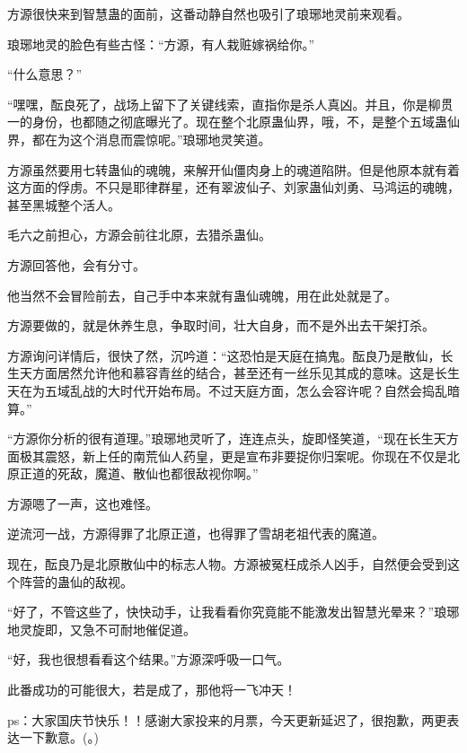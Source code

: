 \begin{this_body}
方源很快来到智慧蛊的面前，这番动静自然也吸引了琅琊地灵前来观看。

琅琊地灵的脸色有些古怪：“方源，有人栽赃嫁祸给你。”

“什么意思？”

“嘿嘿，酝良死了，战场上留下了关键线索，直指你是杀人真凶。并且，你是柳贯一的身份，也都随之彻底曝光了。现在整个北原蛊仙界，哦，不，是整个五域蛊仙界，都在为这个消息而震惊呢。”琅琊地灵笑道。

方源虽然要用七转蛊仙的魂魄，来解开仙僵肉身上的魂道陷阱。但是他原本就有着这方面的俘虏。不只是耶律群星，还有翠波仙子、刘家蛊仙刘勇、马鸿运的魂魄，甚至黑城整个活人。

毛六之前担心，方源会前往北原，去猎杀蛊仙。

方源回答他，会有分寸。

他当然不会冒险前去，自己手中本来就有蛊仙魂魄，用在此处就是了。

方源要做的，就是休养生息，争取时间，壮大自身，而不是外出去干架打杀。

方源询问详情后，很快了然，沉吟道：“这恐怕是天庭在搞鬼。酝良乃是散仙，长生天方面居然允许他和慕容青丝的结合，甚至还有一丝乐见其成的意味。这是长生天在为五域乱战的大时代开始布局。不过天庭方面，怎么会容许呢？自然会捣乱暗算。”

“方源你分析的很有道理。”琅琊地灵听了，连连点头，旋即怪笑道，“现在长生天方面极其震怒，新上任的南荒仙人药皇，更是宣布非要捉你归案呢。你现在不仅是北原正道的死敌，魔道、散仙也都很敌视你啊。”

方源嗯了一声，这也难怪。

逆流河一战，方源得罪了北原正道，也得罪了雪胡老祖代表的魔道。

现在，酝良乃是北原散仙中的标志人物。方源被冤枉成杀人凶手，自然便会受到这个阵营的蛊仙的敌视。

“好了，不管这些了，快快动手，让我看看你究竟能不能激发出智慧光晕来？”琅琊地灵旋即，又急不可耐地催促道。

“好，我也很想看看这个结果。”方源深呼吸一口气。

此番成功的可能很大，若是成了，那他将一飞冲天！

ps：大家国庆节快乐！！感谢大家投来的月票，今天更新延迟了，很抱歉，两更表达一下歉意。(。)

\end{this_body}

